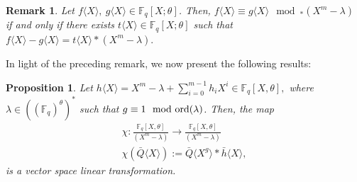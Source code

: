 \documentclass[12pt]{article}
\newtheorem{proposition}{Proposition}
\newtheorem{remark}{Remark}
\begin{document}
\begin{remark}
Let \( f\langle X \rangle,~g\langle X \rangle \in \mathbb{F}_q[X;\theta] \). Then, 
$
f\langle X \rangle \equiv g\langle X \rangle \mod_\ast (X^m - \lambda)
$
if and only if there exists \( t\langle X \rangle \in \mathbb{F}_q[X;\theta] \) such that
$
f\langle X \rangle - g\langle X \rangle = t\langle X \rangle \ast (X^m - \lambda).
$
\end{remark}
In light of the preceding remark, we now present the following results:


\begin{proposition}\label{6Proposition4}
	Let $h\langle X \rangle=X^m-\lambda+\sum_{i=0}^{m-1}h_iX^i\in \mathbb{F}_q[X,\theta],$ where $\lambda\in ((\mathbb{F}_q)^\theta)^\ast$ such that $g\equiv1\mod \textup{ord}(\lambda)$. Then, the map 
	\begin{eqnarray*}
		\chi:\frac{\mathbb{F}_q[X,\theta]}{(X^m-\lambda)} \longrightarrow \frac{\mathbb{F}_q[X,\theta]}{(X^m-\lambda)}\\		\chi(\bar{Q}\langle X \rangle):=\bar{Q}\langle X^g\rangle *\bar{h}\langle X \rangle,
	\end{eqnarray*}
	is a vector space linear transformation.
\end{proposition}
\end{document}
